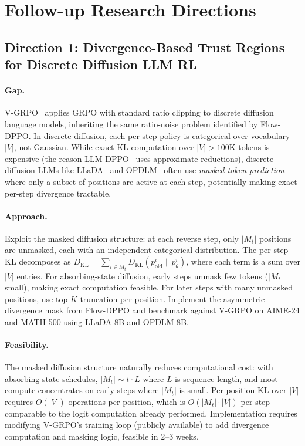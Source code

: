 \documentclass[11pt,a4paper]{article}
\begin{document}
\section{Follow-up Research Directions}

\subsection{Direction 1: Divergence-Based Trust Regions for Discrete Diffusion LLM RL}

\paragraph{Gap.} V-GRPO~\cite{li2026vgrpo} applies GRPO with standard ratio clipping to discrete diffusion language models, inheriting the same ratio-noise problem identified by Flow-DPPO. In discrete diffusion, each per-step policy is categorical over vocabulary $|V|$, not Gaussian. While exact KL computation over $|V| > 100$K tokens is expensive (the reason LLM-DPPO~\cite{qi2026dppo} uses approximate reductions), discrete diffusion LLMs like LLaDA~\cite{nie2026llada2} and OPDLM~\cite{su2026opdlm} often use \emph{masked token prediction} where only a subset of positions are active at each step, potentially making exact per-step divergence tractable.

\paragraph{Approach.} Exploit the masked diffusion structure: at each reverse step, only $|M_t|$ positions are unmasked, each with an independent categorical distribution. The per-step KL decomposes as $D_{\mathrm{KL}} = \sum_{i \in M_t} D_{\mathrm{KL}}(p_{\mathrm{old}}^i \| p_\theta^i)$, where each term is a sum over $|V|$ entries. For absorbing-state diffusion, early steps unmask few tokens ($|M_t|$ small), making exact computation feasible. For later steps with many unmasked positions, use top-$K$ truncation per position. Implement the asymmetric divergence mask from Flow-DPPO and benchmark against V-GRPO on AIME-24 and MATH-500 using LLaDA-8B and OPDLM-8B.

\paragraph{Feasibility.} The masked diffusion structure naturally reduces computational cost: with absorbing-state schedules, $|M_t| \sim t \cdot L$ where $L$ is sequence length, and most compute concentrates on early steps where $|M_t|$ is small. Per-position KL over $|V|$ requires $O(|V|)$ operations per position, which is $O(|M_t| \cdot |V|)$ per step---comparable to the logit computation already performed. Implementation requires modifying V-GRPO's training loop (publicly available) to add divergence computation and masking logic, feasible in 2--3 weeks.
\end{document}

